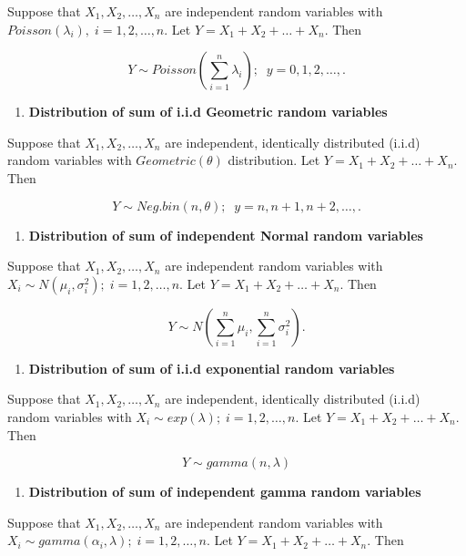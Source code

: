 \documentclass[]{book}
\providecommand{\tightlist}{%
  \setlength{\itemsep}{0pt}\setlength{\parskip}{0pt}}
\begin{document}
Suppose that \(X_1, X_2, \dots, X_n\) are independent random variables with \(Poisson(\lambda_i), \; i=1,2,\dots, n.\) Let \(Y= X_1+X_2+\dots +X_n.\) Then

\[Y\sim Poisson \left(\sum_{i=1}^n\lambda_i\right); \;\;y=0,1,2,\dots,.\]

\begin{enumerate}
\def\labelenumi{\arabic{enumi}.}
\setcounter{enumi}{3}
\tightlist
\item
  \textbf{Distribution of sum of i.i.d Geometric random variables}
\end{enumerate}

Suppose that \(X_1, X_2, \dots, X_n\) are independent, identically distributed (i.i.d) random variables with \(Geometric(\theta)\) distribution. Let \(Y= X_1+X_2+\dots +X_n.\) Then

\[Y\sim Neg.bin(n, \theta); \;\;y=n, n+1, n+2,\dots,.\]

\begin{enumerate}
\def\labelenumi{\arabic{enumi}.}
\setcounter{enumi}{4}
\tightlist
\item
  \textbf{Distribution of sum of independent Normal random variables}
\end{enumerate}

Suppose that \(X_1, X_2, \dots, X_n\) are independent random variables with \(X_i\sim N(\mu_i, \sigma_i^2); \; i=1,2,\dots, n\). Let \(Y= X_1+X_2+\dots +X_n.\) Then

\[Y\sim N\left(\sum_{i=1}^n \mu_i,\sum_{i=1}^n \sigma_i^2  \right).\]

\begin{enumerate}
\def\labelenumi{\arabic{enumi}.}
\setcounter{enumi}{5}
\tightlist
\item
  \textbf{Distribution of sum of i.i.d exponential random variables}
\end{enumerate}

Suppose that \(X_1, X_2, \dots, X_n\) are independent, identically distributed (i.i.d) random variables with \(X_i\sim exp(\lambda);\; i=1,2,\dots, n\). Let \(Y= X_1+X_2+\dots +X_n.\) Then

\[Y \sim gamma(n, \lambda)\]

\begin{enumerate}
\def\labelenumi{\arabic{enumi}.}
\setcounter{enumi}{6}
\tightlist
\item
  \textbf{Distribution of sum of independent gamma random variables}
\end{enumerate}

Suppose that \(X_1, X_2, \dots, X_n\) are independent random variables with \(X_i\sim gamma(\alpha_i, \lambda);\; i=1,2,\dots, n\). Let \(Y= X_1+X_2+\dots +X_n.\) Then
\end{document}
